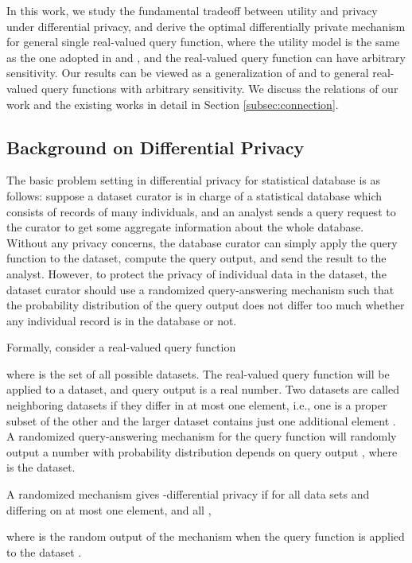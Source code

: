 In this work, we study the fundamental tradeoff between utility and privacy under differential privacy, and derive the optimal differentially private mechanism for  general single real-valued query function, where the utility model is the same as the one adopted in \cite{Ghosh09} and \cite{minimax10}, and the real-valued query function can have arbitrary sensitivity.  Our results can be viewed as a generalization of  \cite{Ghosh09} and \cite{minimax10} to general real-valued query functions with arbitrary sensitivity. We discuss the relations of our work and the existing works in detail in Section \ref{subsec:connection}.



\subsection{Background on Differential Privacy}

The basic problem setting in differential privacy for statistical database is as follows: suppose a dataset curator is in charge of a statistical database which consists of records of many individuals, and an analyst sends a query request to the curator to get some aggregate information about the whole database. Without any privacy concerns, the database curator can simply apply the query function to the dataset, compute the query output, and send the result to the analyst. However, to protect the privacy of individual data in the dataset, the dataset curator should use a randomized query-answering mechanism such that the probability distribution of the query output does not differ too much whether any individual record is in the database or not.

Formally, consider a real-valued query function

where  is the set of all possible datasets. The real-valued query function  will be applied to a dataset, and query output is a real number. Two datasets  are called neighboring datasets if they differ in at most one element, i.e.,  one is a proper subset of the other and the larger dataset contains just one additional element \cite{DPsurvey}. A randomized query-answering mechanism  for the query function  will randomly output a number with probability distribution depends on query output , where  is the dataset.

\begin{definition}
	A randomized mechanism  gives -differential privacy if for all data sets  and  differing on at most one element, and all ,
	
	 where  is the random output of the  mechanism  when the query function  is applied to the dataset .
\end{definition}



